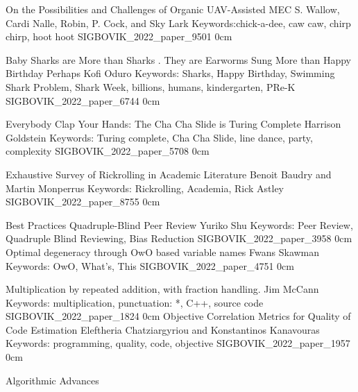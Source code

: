 \addpaper
    {On the Possibilities and Challenges of Organic UAV-Assisted MEC}
    {S. Wallow, Cardi Nalle, Robin, P. Cock, and Sky Lark}
    {Keywords:chick-a-dee, caw caw, chirp chirp, hoot hoot}
    {SIGBOVIK_2022_paper_9501}
    {0cm}
    {}


\addpaper
    {Baby Sharks are More than Sharks . They are Earworms Sung More than Happy Birthday Perhaps}
    {Kofi Oduro}
    {Keywords: Sharks, Happy Birthday, Swimming Shark Problem, Shark Week, billions, humans, kindergarten, PRe-K}
    {SIGBOVIK_2022_paper_6744}
    {0cm}
    {}



\addpaper
    {Everybody Clap Your Hands: The Cha Cha Slide is Turing Complete}
    {Harrison Goldstein}
    {Keywords: Turing complete, Cha Cha Slide, line dance, party, complexity}
    {SIGBOVIK_2022_paper_5708}
    {0cm}
    {}



\addpaper
    {Exhaustive Survey of Rickrolling in Academic Literature}
    {Benoit Baudry and Martin Monperrus}
    {Keywords: Rickrolling, Academia, Rick Astley}
    {SIGBOVIK_2022_paper_8755}
    {0cm}
    {}

\addtrack
    {}{Best Practices}
\addpaper
    {Quadruple-Blind Peer Review}
    {Yuriko Shu}
    {Keywords: Peer Review, Quadruple Blind Reviewing, Bias Reduction}
    {SIGBOVIK_2022_paper_3958}
    {0cm}
    {}
\addpaper
    {Optimal degeneracy through OwO based variable names}
    {Fwans Skawman}
    {Keywords: OwO, What's, This}
    {SIGBOVIK_2022_paper_4751}
    {0cm}
    {}

\addpaper
    {Multiplication by repeated addition, with fraction handling.}
    {Jim McCann}
    {Keywords: multiplication, punctuation: *, C++, source code}
    {SIGBOVIK_2022_paper_1824}
    {0cm}
    {}
\addpaper
    {Objective Correlation Metrics for Quality of Code Estimation}
    {Eleftheria Chatziargyriou and Konstantinos Kanavouras}
    {Keywords: programming, quality, code, objective}
    {SIGBOVIK_2022_paper_1957}
    {0cm}
    {}


\addtrack
    {}{Algorithmic Advances}

